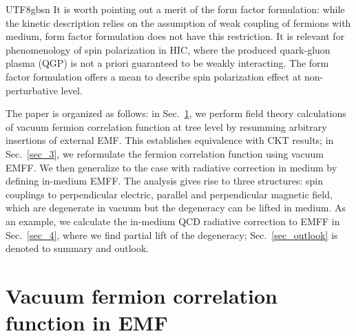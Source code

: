 \documentclass[11pt]{article}\def\baselinestretch{1.4}
\begin{document}
\begin{CJK}{UTF8}{gbsn}
It is worth pointing out a merit of the form factor formulation: while the kinetic description relies on the assumption of weak coupling of fermions with medium, form factor formulation does not have this restriction. It is relevant for phenomenology of spin polarization in HIC, where the produced quark-gluon plasma (QGP) is not a priori guaranteed to be weakly interacting. The form factor formulation offers a mean to describe spin polarization effect at non-perturbative level.

The paper is organized as follows: in Sec.~\ref{sec_2}, we perform field theory calculations of vacuum fermion correlation function at tree level by resumming arbitrary insertions of external EMF. This establishes equivalence with CKT results; in Sec.~\ref{sec_3}, we reformulate the fermion correlation function using vacuum EMFF. We then generalize to the case with radiative correction in medium by defining in-medium EMFF. The analysis gives rise to three structures: spin couplings to perpendicular electric, parallel and perpendicular magnetic field, which are degenerate in vacuum but the degeneracy can be lifted in medium. As an example, we calculate the in-medium QCD radiative correction to EMFF in Sec.~\ref{sec_4}, where we find partial lift of the degeneracy; Sec.~\ref{sec_outlook} is denoted to summary and outlook.


\section{Vacuum fermion correlation function in EMF}\label{sec_2}


\end{CJK}
\end{document}
